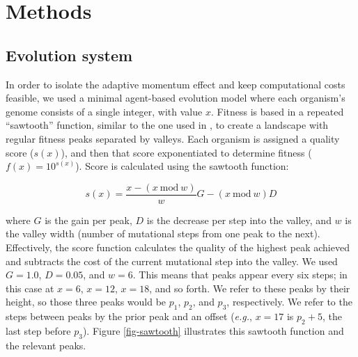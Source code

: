 \section{Methods}

\subsection{Evolution system}
In order to isolate the adaptive momentum effect and keep computational costs feasible, we used a minimal agent-based evolution model where each organism's genome consists of a single integer, with value $x$. 
Fitness is based in a repeated ``sawtooth'' function, similar to the one used in \citep{Bohm2024.04.08.588357}, to create a landscape with regular fitness peaks separated by valleys. 
Each organism is assigned a quality score ($s(x)$), and then that score exponentiated to determine fitness ($f(x)=10^{s(x)}$). 
Score is calculated using the sawtooth function:

\[
s(x) = \frac{x - (x~\text{mod}~w)}{w}G - (x~\text{mod}~w)D
\]

\noindent
where $G$ is the gain per peak, $D$ is the decrease per step into the valley, and $w$ is the valley width (number of mutational steps from one peak to the next). 
Effectively, the score function calculates the quality of the highest peak achieved and subtracts the cost of the current mutational step into the valley. 
We used $G=1.0$, $D=0.05$, and $w=6$.
This means that peaks appear every six steps; in this case at $x=6$, $x=12$, $x=18$, and so forth.
We refer to these peaks by their height, so those three peaks would be \(p_{1}\), \(p_{2}\), and \(p_{3}\), respectively.
We refer to the steps between peaks by the prior peak and an offset (\textit{e.g.}, $x=17$ is $p_{2} + 5$, the last step before $p_{3}$).
Figure \ref{fig-sawtooth} illustrates this sawtooth function and the relevant peaks.


